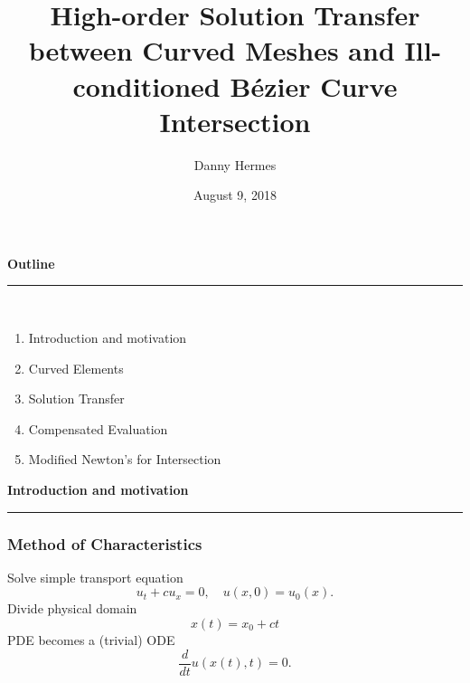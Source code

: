 \documentclass{beamer}
\title[Lagrange and B\'{e}zier]
  {High-order Solution Transfer between Curved Meshes and
  Ill-conditioned B\'{e}zier Curve Intersection}
\date{August 9, 2018}
\author{Danny Hermes}
\institute{{\lmss dhermes@berkeley.edu} \\
           UC Berkeley}
\begin{document}
\maketitle

\begin{frame}
\centering
{\Large\bf Outline} \\
\rule{0.82\textwidth}{1pt} \\[20pt]
\begin{minipage}{0.78\textwidth}\raggedright
\begin{enumerate}
\item Introduction and motivation
\item Curved Elements
\item Solution Transfer
\item Compensated Evaluation
\item Modified Newton's for Intersection
\end{enumerate}
\end{minipage}
\end{frame}


\begin{frame}
\centering
{\Large \bf Introduction and motivation}
\rule{0.82\textwidth}{1pt}
\end{frame}

\begin{frame}
\frametitle{Method of Characteristics}
\pause
Solve simple transport equation
\begin{equation*}
u_t + c u_x = 0, \quad u(x, 0) = u_0(x).
\end{equation*}
\pause
Divide physical domain
\begin{equation*}
x(t) = x_0 + ct
\end{equation*}
\pause
PDE becomes a (trivial) ODE
\begin{equation*}
\frac{d}{dt} u(x(t), t) = 0.
\end{equation*}
\end{frame}
\end{document}
